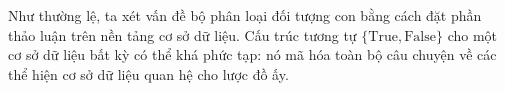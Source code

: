 Như thường lệ, ta xét vấn đề bộ phân loại đối tượng con bằng cách đặt phần thảo luận trên nền tảng cơ sở dữ liệu. Cấu trúc tương tự $\{\mathrm{True},\mathrm{False}\}$ cho một cơ sở dữ liệu bất kỳ có thể khá phức tạp: nó mã hóa toàn bộ câu chuyện về các thể hiện cơ sở dữ liệu quan hệ cho lược đồ ấy.
